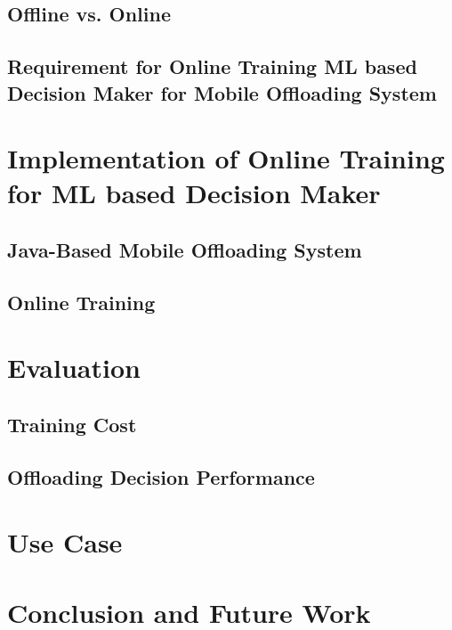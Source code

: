 \documentclass[10pt, conference, compsocconf]{IEEEtran}
\begin{document}
\subsection{Offline vs. Online}
%
\subsection{Requirement for Online Training ML based Decision Maker for
Mobile Offloading System}
%
\section{Implementation of Online Training for ML based Decision Maker}
%
\subsection{Java-Based Mobile Offloading System}
%
\subsection{Online Training}
%
\section{Evaluation}
%
\subsection{Training Cost}
%
\subsection{Offloading Decision Performance}
%
\section{Use Case}
%
\section{Conclusion and Future Work}
% 
%
%
%

\end{document}
